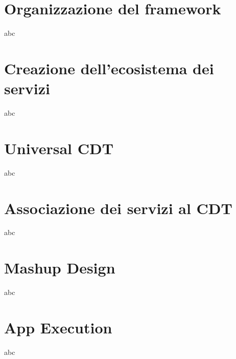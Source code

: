 \section{Organizzazione del framework}

abc

\section{Creazione dell'ecosistema dei servizi}

abc

\section{Universal CDT}

abc

\section{Associazione dei servizi al CDT}

abc

\section{Mashup Design}

abc

\section{App Execution}

abc